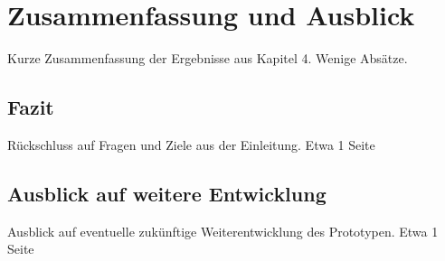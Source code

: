 \chapter{Zusammenfassung und Ausblick} %
Kurze Zusammenfassung der Ergebnisse aus Kapitel 4.
Wenige Absätze.

\section{Fazit} %
Rückschluss auf Fragen und Ziele aus der Einleitung.
Etwa 1 Seite

\section{Ausblick auf weitere Entwicklung} %
Ausblick auf eventuelle zukünftige Weiterentwicklung des Prototypen.
Etwa 1 Seite
